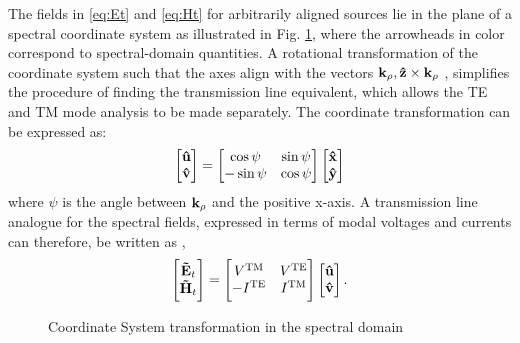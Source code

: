 \documentclass[12pt]{article}
\begin{document}
The fields in \eqref{eq:Et} and  \eqref{eq:Ht} for arbitrarily aligned sources lie in the plane of a spectral coordinate system as illustrated in Fig. \ref{fig:SpCS}, where the arrowheads in color correspond to spectral-domain quantities. A rotational transformation of the coordinate system such that the axes align with the vectors $\mathbf{k}_{\rho}, \mathbf{\hat z} \times \mathbf{k}_{\rho}$ \cite{Itoh1980}, simplifies the procedure of finding the transmission line equivalent, which allows the TE and TM mode analysis to be made separately. The coordinate transformation can be expressed as:
%
\begin{equation}
  \begin{bmatrix}
    \mathbf{\hat u} \\
    \mathbf{\hat v}
  \end{bmatrix}
  =
  \begin{bmatrix}
    \cos \psi & \sin \psi \\
    -\sin \psi & \cos \psi
  \end{bmatrix}
  \begin{bmatrix}
    \mathbf{\hat x} \\
    \mathbf{\hat y}
  \end{bmatrix}
  \label{eq:transformation}
\end{equation}
%
where $\psi$ is the angle between $\mathbf{k_{\rho}}$ and the positive x-axis. A transmission line analogue for the spectral fields, expressed in terms of modal voltages and currents can therefore, be written as \cite{Kastner1988,Michalski1997},
%
\begin{equation}
  \begin{bmatrix}
    \mathbf{\tilde{E}}_t \\
    \mathbf{\tilde{H}}_t
  \end{bmatrix}
  =
  \begin{bmatrix}
    V^{\mathrm{TM}} & V^{\mathrm{TE}} \\
    -I^{\mathrm{\mathrm{TE}}} & I^{\mathrm{TM}}
  \end{bmatrix}
  \begin{bmatrix}
    \mathbf{\hat u} \\
    \mathbf{\hat v}
  \end{bmatrix}
  \label{eq:EHVI}.
\end{equation}
%
\begin{figure}[t!]
  \centering
  \def\svgwidth{.75\linewidth}
  
  \caption{Coordinate System transformation in the spectral domain}
  \label{fig:SpCS}
\end{figure}
\end{document}
